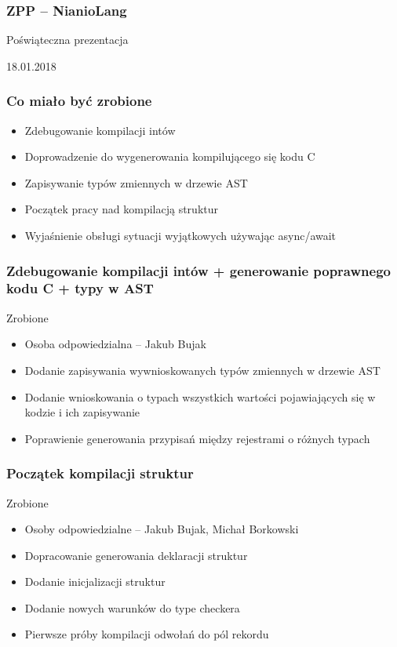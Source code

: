 \documentclass{beamer}
\begin{document}
	\begin{frame}
		\frametitle{ZPP -- NianioLang}
		Poświąteczna prezentacja
		
		18.01.2018
	\end{frame}
	
	\begin{frame}
		\frametitle{Co miało być zrobione}
		\begin{itemize}
			\item Zdebugowanie kompilacji intów
			\item Doprowadzenie do wygenerowania kompilującego się kodu C
			\item Zapisywanie typów zmiennych w drzewie AST
			\item Początek pracy nad kompilacją struktur
			\item Wyjaśnienie obsługi sytuacji wyjątkowych używając async/await
		\end{itemize}
	\end{frame}
	
	\begin{frame}[fragile]
		\frametitle{Zdebugowanie kompilacji intów + generowanie poprawnego kodu C + typy w AST}
		\color{green} Zrobione
		\begin{itemize}
			\item Osoba odpowiedzialna -- Jakub Bujak
			\item Dodanie zapisywania wywnioskowanych typów zmiennych w drzewie AST
			\item Dodanie wnioskowania o typach wszystkich wartości pojawiających się w kodzie i ich zapisywanie
			\item Poprawienie generowania przypisań między rejestrami o różnych typach
		\end{itemize}
	\end{frame}
	
	\begin{frame}[fragile]
		\frametitle{Początek kompilacji struktur}
		\color{green} Zrobione
		\begin{itemize}
		 \item Osoby odpowiedzialne -- Jakub Bujak, Michał Borkowski
		 \item Dopracowanie generowania deklaracji struktur
		 \item Dodanie inicjalizacji struktur
		 \item Dodanie nowych warunków do type checkera
		 \item Pierwsze próby kompilacji odwołań do pól rekordu
		\end{itemize}
	\end{frame}
	
\end{document}
